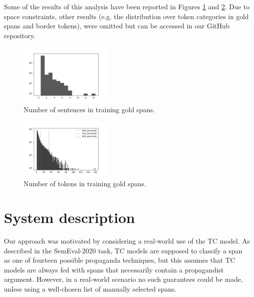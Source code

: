 \documentclass[11pt]{article}
\newcommand{\pol}[1]{{\fontfamily{pcr}\selectfont#1}}
\begin{document}
Some of the results of this analysis have been reported in Figures \ref{fig:nb-sentences} and \ref{fig:nb-tokens}. Due to space constraints, other results (e.g. the distribution over token categories in gold spans and border tokens), were omitted but can be accessed in our GitHub repository.

\begin{figure}[h]
    \centering
    \includegraphics[width=0.4\textwidth]{images/sentences.pdf}
    \caption{Number of sentences in training gold spans.}
    \label{fig:nb-sentences}
\end{figure}

\begin{figure}[h]
    \centering
    \includegraphics[width=0.4\textwidth]{images/tok_dist.pdf}
    \caption{Number of tokens in training gold spans.}
    \label{fig:nb-tokens}
\end{figure}

\section{System description} \label{sec:sys-desc}
Our approach was motivated by considering a real-world use of the \pol{TC} model. As described in the SemEval-2020 task, \pol{TC} models are supposed to classify a span as one of fourteen possible propaganda techniques, but this assumes that \pol{TC} models are always fed with spans that necessarily contain a propagandist argument. However, in a real-world scenario no such guarantees could be made, unless using a well-chosen list of manually selected spans.
\end{document}
